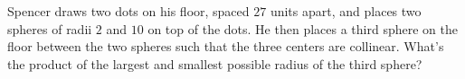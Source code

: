 Spencer draws two dots on his floor, spaced $27$ units apart, and places two spheres of radii $2$ and $10$ on top of the dots. He then places a third sphere on the floor between the two spheres such that the three centers are collinear. What's the product of the largest and smallest possible radius of the third sphere?
